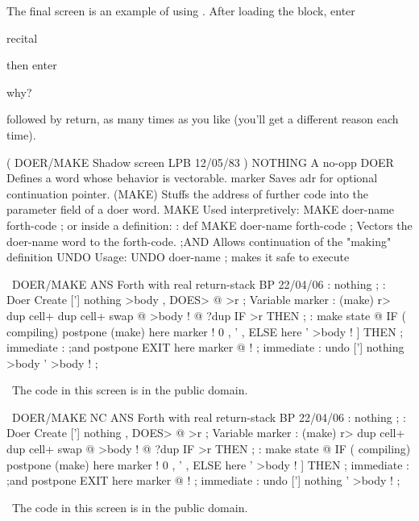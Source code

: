 The final screen is an example of using .  After loading
the block, enter
\begin{Code}
recital
\end{Code}
then enter 
\begin{Code}
why?
\end{Code}
followed by return, as many times as you like (you'll get a different
reason each time).

\vfill
\setcounter{screen}{21}
\begin{Screen}
( DOER/MAKE   Shadow screen                      LPB 12/05/83 )
NOTHING   A no-opp
DOER      Defines a word whose behavior is vectorable.
marker    Saves adr for optional continuation pointer.
(MAKE)    Stuffs the address of further code into the
          parameter field of a doer word.
MAKE      Used interpretively:  MAKE doer-name  forth-code ;
          or inside a definition:
             : def   MAKE doer-name  forth-code ;
          Vectors the doer-name word to the forth-code.
;AND      Allows continuation of the "making" definition
UNDO      Usage:  UNDO doer-name ; makes it safe to execute




\end{Screen}
\vfill
\begin{Screen}
\ DOER/MAKE   ANS Forth with real return-stack   BP 22/04/06 
: nothing ;
: Doer   Create  ['] nothing  >body ,  DOES> @ >r ;
Variable marker
: (make)  r>  dup cell+  dup cell+  swap @  >body !
   @ ?dup IF >r THEN ;
: make   state @ IF ( compiling)
   postpone (make)  here marker !  0 , ' ,
   ELSE  here '  >body !
   ]  THEN ;   immediate
: ;and   postpone EXIT  here marker @ ! ;   immediate
: undo   ['] nothing  >body  '  >body ! ;

\ The code in this screen is in the public domain.


\end{Screen}
\vfill
\begin{Screen}
\ DOER/MAKE NC ANS Forth with real return-stack  BP 22/04/06 
: nothing ;
: Doer   Create  ['] nothing ,  DOES> @ >r ;
Variable marker
: (make)  r>  dup cell+  dup cell+  swap @  >body !
   @ ?dup IF >r THEN ;
: make   state @ IF ( compiling)
   postpone (make)  here marker !  0 , ' ,
   ELSE  here '  >body !
   ]  THEN ;   immediate
: ;and   postpone EXIT  here marker @ ! ;   immediate
: undo   ['] nothing  '  >body ! ;

\ The code in this screen is in the public domain.


\end{Screen}
